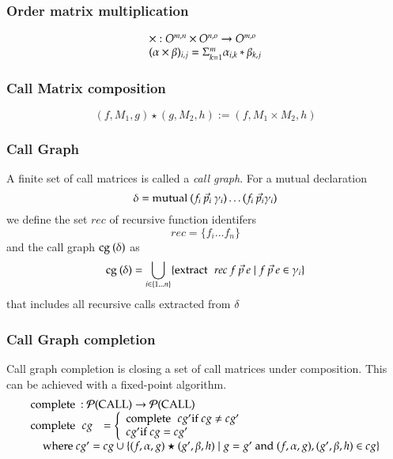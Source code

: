 \subsubsection{Order matrix multiplication}
\[ 
\begin{array}[t]{l}
\times : O^{m,n} \times O^{n,o} \rightarrow O^{m,o} \\
   (\alpha \times \beta)_{i,j} = \Sigma^{m}_{k=1}{\alpha_{i,k} * \beta_{k,j}}
\end{array}
\]

\subsubsection{Call Matrix composition}
\[(f,M_1,g) \star (g,M_2,h) := (f,M_1 \times M_2,h)\]
\newcommand{\cg}{\opn{cg}\:}
\newcommand{\complete}{\opn{complete}\:}

\subsubsection{Call Graph}
A finite set of call matrices is called a \emph{call graph}.
For a mutual declaration 
\[ \delta = \mathrm{mutual}\: (f_i \: \vec{p}_i \: \gamma_i) \ldots (f_i \: \vec{p}_i \gamma_i) \] 
we define the set $rec$ of recursive function identifers
\[ rec = \{ f_i \ldots f_n \} \]
and the call graph $\cg(\delta)$ as
\[ \cg(\delta) = \bigcup_{i \in \{1 \ldots n\}} \{ \extr \: rec \: f \: \vec{p} \: e \mid f \: \vec{p} \: e \in \gamma_i  \} \] 
that includes all recursive calls extracted from $\delta$

\subsubsection{Call Graph completion}
Call graph completion is closing a set of call matrices under composition.
This can be achieved with a fixed-point algorithm.
\[
\begin{array}[t]{ll}
\multicolumn{2}{l}{\complete : \pset{\call} \ra \pset{\call}}\\ 
\complete \: cg  & = \left\{ \begin{array}{l} 
    \complete \: cg' \mbox{if } cg \neq cg'\\
     cg' \mbox{if } cg = cg'  
     \end{array}\right.\\
\multicolumn{2}{l}{\spc \mbox { where } cg' = cg \cup \{ (f,\alpha,g) \star (g',\beta,h) \mid g = g' \mbox{ and } (f,\alpha,g) , (g',\beta,h) \in cg \}} \\
\end{array}
\]

